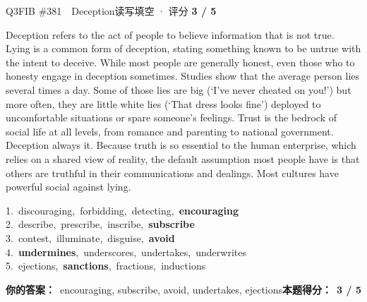 \begin{qblock}{Q3\quad FIB \#381\ \ Deception}{读写填空 · 评分 \textcolor{cAccent}{\bfseries 3 / 5}}
\begin{promptbox}
Deception refers to the act of  people to believe information that is not true. Lying is a common form of deception, stating something known to be untrue with the intent to deceive. While most people are generally honest, even those who  to honesty engage in deception sometimes. Studies show that the average person lies several times a day. Some of those lies are big (`I've never cheated on you!') but more often, they are little white lies (`That dress looks fine') deployed to  uncomfortable situations or spare someone's feelings. Trust is the bedrock of social life at all levels, from romance and parenting to national government. Deception always  it. Because truth is so essential to the human enterprise, which relies on a shared view of reality, the default assumption most people have is that others are truthful in their communications and dealings. Most cultures have powerful social  against lying.
\end{promptbox}
{\small
1.\ discouraging,\ forbidding,\ detecting,\ \textbf{encouraging}\\
2.\ describe,\ prescribe,\ inscribe,\ \textbf{subscribe}\\
3.\ contest,\ illuminate,\ disguise,\ \textbf{avoid}\\
4.\ \textbf{undermines},\ underscores,\ undertakes,\ underwrites\\
5.\ ejections,\ \textbf{sanctions},\ fractions,\ inductions}
\par\smallskip
\textbf{你的答案：}\ encouraging, subscribe, avoid, {\color{cWrong}undertakes, ejections}\qquad\textbf{本题得分：}\ {\color{cAccent}\bfseries 3 / 5}
\end{qblock}

